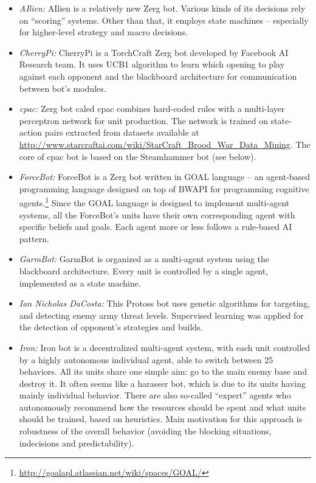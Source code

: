 \begin{itemize}
  \setlength\itemsep{1em}
  
  \item {\em AIlien:} AIlien is a relatively new Zerg bot. Various kinds of its decisions rely on ``scoring'' systems. Other than that, it employs state machines -- especially for higher-level strategy and macro decisions.
  
  \item {\em CherryPi:} CherryPi is a TorchCraft Zerg bot developed by Facebook AI Research team. It uses UCB1 algorithm to learn which opening to play against each opponent and the blackboard architecture for communication between bot's modules.
  
  \item {\em cpac:} Zerg bot caled cpac combines hard-coded rules with a multi-layer perceptron network for unit production. The network is trained on state-action pairs extracted from datasets available at \url{http://www.starcraftai.com/wiki/StarCraft_Brood_War_Data_Mining}. The core of cpac bot is based on the Steamhammer bot (see below).
  
  \item {\em ForceBot:} ForceBot is a Zerg bot written in GOAL language -- an agent-based programming language designed on top of BWAPI for programming cognitive agents.\footnote{\url{http://goalapl.atlassian.net/wiki/spaces/GOAL/}} Since the GOAL language is designed to implement multi-agent systems, all the ForceBot's units have their own corresponding agent with specific beliefs and goals. Each agent more or less follows a rule-based AI pattern.  
  
  \item {\em GarmBot:} GarmBot is organized as a multi-agent system using the blackboard architecture. Every unit is controlled by a single agent, implemented as a state machine.
  
  \item {\em Ian Nicholas DaCosta:} This Protoss bot uses genetic algorithms for targeting, and detecting enemy army threat levels. Supervised learning was applied for the detection of opponent's strategies and builds.
  
  \item {\em Iron:} Iron bot is a decentralized multi-agent system, with each unit controlled by a highly autonomous individual agent, able to switch between 25 behaviors. All its units share one simple aim: go to the main enemy base and destroy it. It often seems like a harasser bot, which is due to its units having mainly individual behavior. There are also so-called ``expert'' agents who autonomously recommend how the resources should be spent and what units should be trained, based on heuristics. Main motivation for this approach is robustness of the overall behavior (avoiding the blocking situations, indecisions and predictability).  
  

\end{itemize}
